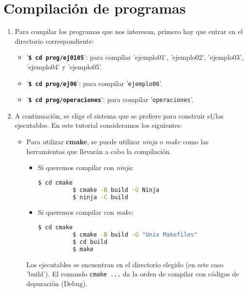 %

\section{Compilación de programas}\label{sec:compilacion}

\begin{enumerate}
\item Para compilar los programas que nos interesan, primero hay que entrar en el
  directorio correspondiente:
  \vspace{-\topsep}
  \begin{itemize}
    \tightlist
  \item '\textbf{\texttt{\$ cd prog/ej0105}}':
    para compilar '\textsf{ejemplo01}', '\textsf{ejemplo02}', '\textsf{ejemplo03}',
    '\textsf{ejemplo04}' y '\textsf{ejemplo05}'.
  \item '\textbf{\texttt{\$ cd prog/ej06}}': para compilar '\texttt{ejemplo06}'.
  \item '\textbf{\texttt{\$ cd prog/operaciones}}': para compilar '\texttt{operaciones}'.
\end{itemize}
\item A continuación, se elige el sistema que se prefiere para construir el/los
  ejecutables.
  En este tutorial consideramos los siguientes:
  \vspace{-\topsep}  
  \begin{itemize}
    \tightlist
  \item Para utilizar \textbf{cmake}, se puede utilizar \emph{ninja} o \emph{make} como
    las herramientas que llevarán a cabo la compilación.
    \begin{itemize}
      \item Si queremos compilar con \emph{ninja}:
        \begin{lstlisting}[language=bash]
          $ cd cmake
          $ cmake -B build -G Ninja
          $ ninja -C build
        \end{lstlisting}
      \item Si queremos compilar con \emph{make}:
        \begin{lstlisting}[language=bash]
          $ cd cmake
          $ cmake -B build -G "Unix Makefiles"
          $ cd build
          $ make
        \end{lstlisting}
    \end{itemize}
    Los ejecutables se encuentran en el directorio elegido (en este caso 'build').
    El comando \texttt{cmake ...} da la orden de compilar con códigos de depuración
    (\textsf{Debug}).


\end{itemize}
\end{enumerate}
